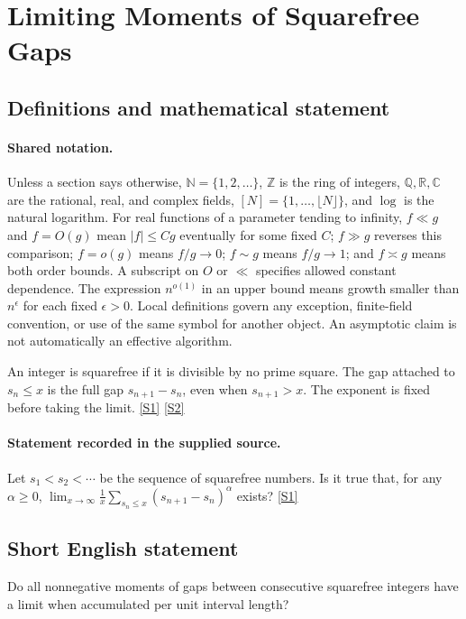 \documentclass[11pt,a4paper]{article}
\newcommand{\N}{\mathbb{N}}
\newcommand{\Z}{\mathbb{Z}}
\newcommand{\Q}{\mathbb{Q}}
\newcommand{\R}{\mathbb{R}}
\newcommand{\C}{\mathbb{C}}
\newcommand{\sref}[2]{\hyperlink{source:#1:#2}{[S#2]}}
\begin{document}
\section{Limiting Moments of Squarefree Gaps}\label{statement}


\subsection{Definitions and mathematical statement}

\paragraph{Shared notation.}Unless a section says otherwise, $\N=\{1,2,\ldots\}$,
$\Z$ is the ring of integers, $\Q,\R,\C$ are the rational, real, and complex
fields, $[N]=\{1,\ldots,\lfloor N\rfloor\}$, and $\log$ is the natural
logarithm. For real functions of a parameter tending to infinity,
$f\ll g$ and $f=O(g)$ mean $|f|\leq Cg$ eventually for some fixed $C$;
$f\gg g$ reverses this comparison; $f=o(g)$ means $f/g\to0$;
$f\sim g$ means $f/g\to1$; and $f\asymp g$ means both order bounds.
A subscript on $O$ or $\ll$ specifies allowed constant dependence.
The expression $n^{o(1)}$ in an upper bound means growth smaller than
$n^\epsilon$ for each fixed $\epsilon>0$. Local definitions govern any
exception, finite-field convention, or use of the same symbol for another
object. An asymptotic claim is not automatically an effective algorithm.



An integer is squarefree if it is divisible by no prime square. The gap attached to $s_n\leq x$ is the full gap $s_{n+1}-s_n$, even when $s_{n+1}>x$. The exponent is fixed before taking the limit. \sref{statement}{1} \sref{statement}{2}

\paragraph{Statement recorded in the supplied source.}
Let $s_1<s_2<\cdots$ be the sequence of squarefree numbers. Is it true that, for any $\alpha \geq 0$, $ \lim_{x\to \infty}\frac{1}{x}\sum_{s_n\leq x}(s_{n+1}-s_n)^\alpha $ exists? \sref{statement}{1}

\subsection{Short English statement}

Do all nonnegative moments of gaps between consecutive squarefree integers have a limit when accumulated per unit interval length?
\end{document}
